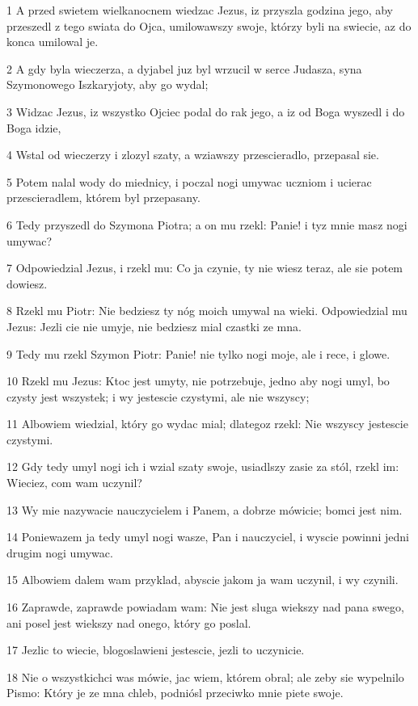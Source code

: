 \par 1 A przed swietem wielkanocnem wiedzac Jezus, iz przyszla godzina jego, aby przeszedl z tego swiata do Ojca, umilowawszy swoje, którzy byli na swiecie, az do konca umilowal je.
\par 2 A gdy byla wieczerza, a dyjabel juz byl wrzucil w serce Judasza, syna Szymonowego Iszkaryjoty, aby go wydal;
\par 3 Widzac Jezus, iz wszystko Ojciec podal do rak jego, a iz od Boga wyszedl i do Boga idzie,
\par 4 Wstal od wieczerzy i zlozyl szaty, a wziawszy przescieradlo, przepasal sie.
\par 5 Potem nalal wody do miednicy, i poczal nogi umywac uczniom i ucierac przescieradlem, którem byl przepasany.
\par 6 Tedy przyszedl do Szymona Piotra; a on mu rzekl: Panie! i tyz mnie masz nogi umywac?
\par 7 Odpowiedzial Jezus, i rzekl mu: Co ja czynie, ty nie wiesz teraz, ale sie potem dowiesz.
\par 8 Rzekl mu Piotr: Nie bedziesz ty nóg moich umywal na wieki. Odpowiedzial mu Jezus: Jezli cie nie umyje, nie bedziesz mial czastki ze mna.
\par 9 Tedy mu rzekl Szymon Piotr: Panie! nie tylko nogi moje, ale i rece, i glowe.
\par 10 Rzekl mu Jezus: Ktoc jest umyty, nie potrzebuje, jedno aby nogi umyl, bo czysty jest wszystek; i wy jestescie czystymi, ale nie wszyscy;
\par 11 Albowiem wiedzial, który go wydac mial; dlategoz rzekl: Nie wszyscy jestescie czystymi.
\par 12 Gdy tedy umyl nogi ich i wzial szaty swoje, usiadlszy zasie za stól, rzekl im: Wieciez, com wam uczynil?
\par 13 Wy mie nazywacie nauczycielem i Panem, a dobrze mówicie; bomci jest nim.
\par 14 Poniewazem ja tedy umyl nogi wasze, Pan i nauczyciel, i wyscie powinni jedni drugim nogi umywac.
\par 15 Albowiem dalem wam przyklad, abyscie jakom ja wam uczynil, i wy czynili.
\par 16 Zaprawde, zaprawde powiadam wam: Nie jest sluga wiekszy nad pana swego, ani posel jest wiekszy nad onego, który go poslal.
\par 17 Jezlic to wiecie, blogoslawieni jestescie, jezli to uczynicie.
\par 18 Nie o wszystkichci was mówie, jac wiem, którem obral; ale zeby sie wypelnilo Pismo: Który je ze mna chleb, podniósl przeciwko mnie piete swoje.
